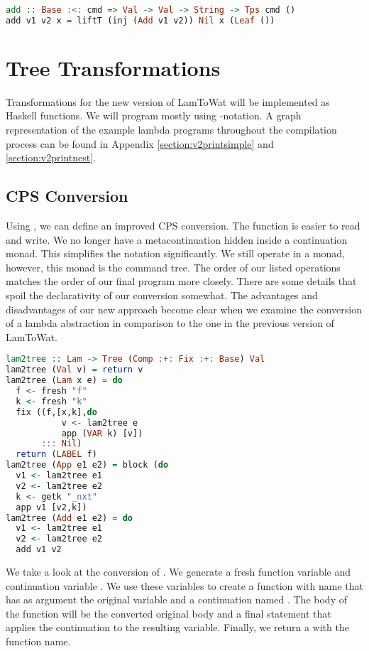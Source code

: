 \begin{lstlisting}[language=Haskell]
add :: Base :<: cmd => Val -> Val -> String -> Tps cmd ()
add v1 v2 x = liftT (inj (Add v1 v2)) Nil x (Leaf ())
\end{lstlisting}

\section{\label{section:treensforms}Tree Transformations}
Transformations for the new version of LamToWat will be implemented as Haskell functions. We will program mostly using -notation. A graph representation of the example lambda programs throughout the compilation process can be found in Appendix \ref{section:v2printsimple} and \ref{section:v2printnest}.

\subsection{\label{subsection:cpsconvert2}CPS Conversion}
Using , we can define an improved CPS conversion. The function is easier to read and write. We no longer have a metacontinuation hidden inside a continuation monad. This simplifies the notation significantly. We still operate in a monad, however, this monad is the command tree. The order of our listed operations matches the order of our final program more closely. There are some details that spoil the declarativity of our conversion somewhat. The advantages and disadvantages of our new approach become clear when we examine the conversion of a lambda abstraction in comparison to the one in the previous version of LamToWat.

\begin{lstlisting}[language=Haskell]
lam2tree :: Lam -> Tree (Comp :+: Fix :+: Base) Val
lam2tree (Val v) = return v
lam2tree (Lam x e) = do
  f <- fresh "f"
  k <- fresh "k"
  fix ((f,[x,k],do
           v <- lam2tree e
           app (VAR k) [v])
       ::: Nil)
  return (LABEL f)
lam2tree (App e1 e2) = block (do
  v1 <- lam2tree e1
  v2 <- lam2tree e2
  k <- getk "_nxt"
  app v1 [v2,k])
lam2tree (Add e1 e2) = do
  v1 <- lam2tree e1
  v2 <- lam2tree e2
  add v1 v2
\end{lstlisting}

We take a look at the conversion of . We generate a fresh function variable  and continuation variable . We use these variables to create a function with name  that has as argument the original variable and a continuation named . The body of the function will be the converted original body and a final statement that applies the continuation to the resulting variable. Finally, we return a  with the function name.

